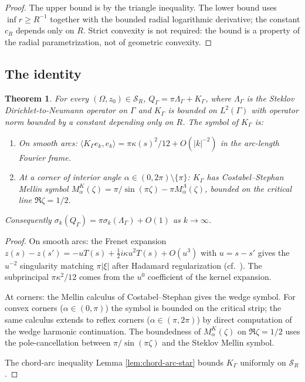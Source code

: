 \documentclass[11pt,reqno]{amsart}
\theoremstyle{plain}
\newtheorem{theorem}{Theorem}[section]
\theoremstyle{definition}
\theoremstyle{remark}
\newcommand{\Scal}{\mathcal{S}}
\newcommand{\Qop}{Q}
\newcommand{\Lambdaop}{\Lambda}
\begin{document}
\begin{proof}
The upper bound is by the triangle inequality. The lower bound uses $\inf r \geq R^{-1}$ together with the bounded radial logarithmic derivative; the constant $c_R$ depends only on $R$. Strict convexity is not required: the bound is a property of the radial parametrization, not of geometric convexity.
\end{proof}

\subsection{The identity}\label{ss:identity}

\begin{theorem}\label{thm:chord-arc-unified}
For every $(\Omega, z_0) \in \Scal_R$, $\Qop_\Gamma = \pi\Lambdaop_\Gamma + K_\Gamma$, where $\Lambdaop_\Gamma$ is the Steklov Dirichlet-to-Neumann operator on $\Gamma$ and $K_\Gamma$ is bounded on $L^2(\Gamma)$ with operator norm bounded by a constant depending only on $R$. The symbol of $K_\Gamma$ is:
\begin{enumerate}
\item[\rm(i)] On smooth arcs: $\langle K_\Gamma e_k, e_k\rangle = \pi\kappa(s)^2/12 + O(|k|^{-2})$ in the arc-length Fourier frame.
\item[\rm(ii)] At a corner of interior angle $\alpha \in (0, 2\pi) \setminus \{\pi\}$: $K_\Gamma$ has Costabel--Stephan Mellin symbol $M^K_\alpha(\zeta) = \pi/\sin(\pi\zeta) - \pi M^{\Lambdaop}_\alpha(\zeta)$, bounded on the critical line $\Re\zeta = 1/2$.
\end{enumerate}
Consequently $\sigma_k(\Qop_\Gamma) = \pi\sigma_k(\Lambdaop_\Gamma) + O(1)$ as $k \to \infty$.
\end{theorem}

\begin{proof}
On smooth arcs: the Frenet expansion $z(s) - z(s') = -uT(s) + \tfrac12 i\kappa u^2 T(s) + O(u^3)$ with $u = s - s'$ gives the $u^{-2}$ singularity matching $\pi|\xi|$ after Hadamard regularization (cf.\ \cite[Theorem 8.12]{McLean}). The subprincipal $\pi\kappa^2/12$ comes from the $u^0$ coefficient of the kernel expansion.

At corners: the Mellin calculus of Costabel--Stephan \cite{CostabelStephan} gives the wedge symbol. For convex corners ($\alpha \in (0, \pi)$) the symbol is bounded on the critical strip; the same calculus extends to reflex corners ($\alpha \in (\pi, 2\pi)$) by direct computation of the wedge harmonic continuation. The boundedness of $M^K_\alpha(\zeta)$ on $\Re\zeta = 1/2$ uses the pole-cancellation between $\pi/\sin(\pi\zeta)$ and the Steklov Mellin symbol.

The chord-arc inequality Lemma \ref{lem:chord-arc-star} bounds $K_\Gamma$ uniformly on $\Scal_R$.
\end{proof}
\end{document}
